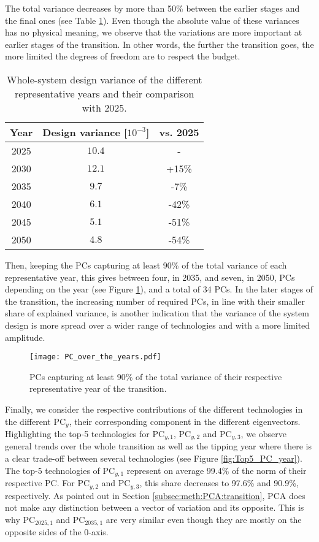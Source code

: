 The total variance decreases by more than 50\% between the earlier stages and the final ones (see Table \ref{tab:design_variance}). Even though the absolute value of these variances has no physical meaning, we observe that the variations are more important at earlier stages of the transition. In other words, the further the transition goes, the more limited the degrees of freedom are to respect the  budget.

\begin{table}[htbp]
\caption{Whole-system design variance of the different representative years and their comparison with 2025.} 
\label{tab:design_variance}
\centering
\begin{tabular}{c c c}
\toprule
\textbf{Year}      & \textbf{Design variance} [$10^{-3}$]	 &	\textbf{vs. 2025}\\
\midrule
2025 	&	$10.4$	& - 	\\
2030 	&	$12.1$	& +15\%	\\
2035 	&	$9.7$	& -7\% 	\\
2040 	&	$6.1$	& -42\% 	\\
2045 	&	$5.1$	& -51\% 	\\
2050 	&	$4.8$	& -54\% 	\\
\bottomrule
\end{tabular}
\end{table}

Then, keeping the \gls{PCs} capturing at least 90\% of the total variance of each representative year, this gives between four, in 2035, and seven, in 2050, \gls{PCs} depending on the year (see Figure \ref{fig:PC_over_the_years}), and a total of 34 \gls{PCs}. In the later stages of the transition, the increasing number of required \gls{PCs}, in line with their smaller share of explained variance, is another indication that the variance of the system design is more spread over a wider range of technologies and with a more limited amplitude. 

\begin{figure}[!htbp]
\centering
\texttt{[image: PC\_over\_the\_years.pdf]}
\caption{\gls{PCs} capturing at least 90\% of the total variance of their respective representative year of the transition. }
\label{fig:PC_over_the_years}
\end{figure}

Finally, we consider the respective contributions of the different technologies in the different $\text{PC}_{y}$, \ie their corresponding component in the different eigenvectors. Highlighting the top-5 technologies for $\text{PC}_{y,1}$, $\text{PC}_{y,2}$ and $\text{PC}_{y,3}$, we observe general trends over the whole transition as well as the tipping year where there is a clear trade-off between several technologies (see Figure \ref{fig:Top5_PC_year}). The top-5 technologies of $\text{PC}_{y,1}$ represent on average 99.4\% of the norm of their respective PC. For $\text{PC}_{y,2}$ and $\text{PC}_{y,3}$, this share decreases to 97.6\% and 90.9\%, respectively.  As pointed out in Section \ref{subsec:meth:PCA:transition}, \gls{PCA} does not make any distinction between a vector of variation and its opposite. This is why $\text{PC}_{2025,1}$ and $\text{PC}_{2035,1}$ are very similar even though they are mostly on the opposite sides of the 0-axis.

